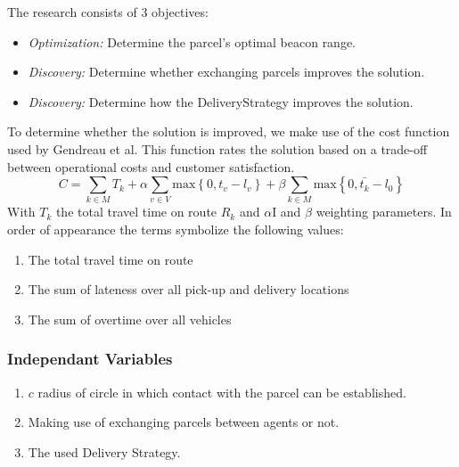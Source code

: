 \documentclass[../main.tex]{subfiles}
\begin{document}
The research consists of 3 objectives:
\begin{itemize}
	\item \textit{Optimization:} Determine the parcel's optimal beacon range.
	\item \textit{Discovery:} Determine whether exchanging parcels improves the solution.
	\item \textit{Discovery:} Determine how the DeliveryStrategy improves the solution.
\end{itemize}
To determine whether the solution is improved, we make use of the cost function used by Gendreau et al. This function rates the solution based on a trade-off between operational costs and customer satisfaction. \cite{gendreau2006neighborhood}
$$
C = \sum_{k \in M}{T_k} + \alpha \sum_{v \in V} \text{max} \left\{ 0, t_v - l_v \right\} + \beta \sum_{k \in M} \text{max} \left\{0, \bar{t_k} - l_0 \right\}
$$
With $T_k$ the total travel time on route $R_k$ and $\alpha$I and $\beta$ weighting parameters. In order of appearance the terms symbolize the following values:
\begin{enumerate}
	\item The total travel time on route
	\item The sum of lateness over all pick-up and delivery locations
	\item The sum of overtime over all vehicles
\end{enumerate}

\subsubsection{Independant Variables}
\begin{enumerate}
	\item $c$ radius of circle in which contact with the parcel can be established.
	\item Making use of exchanging parcels between agents or not.
	\item The used Delivery Strategy.
\end{enumerate}
\end{document}
